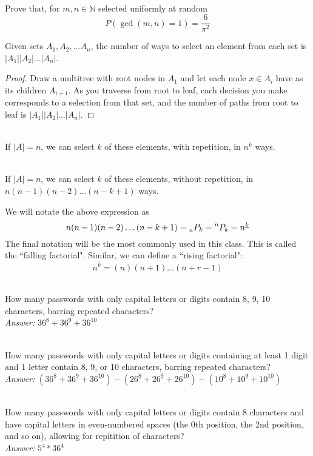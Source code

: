 \documentclass[11pt,twosided]{article}
\begin{document}
\begin{problem} \\
Prove that, for $m,n\in\mathbb{N}$ selected uniformly at random $$P(\gcd(m,n)=1) = \frac{6}{\pi^2}$$
\end{problem}
\begin{theorem}
Given sets $A_1, A_2, \dots A_n$, the number of ways to select an element from each set is $|A_1||A_2|\dots|A_n|$. 
\end{theorem}
\begin{proof}
Draw a multitree  with root nodes in $A_1$ and let each node $x\in A_i$ have as its children $A_{i+1}$. As you traverse from root to leaf, each decision you make corresponds to a selection from that set, and the number of paths from root to leaf is $|A_1||A_2|\dots|A_n|$.
\end{proof}
\begin{corollary}\\
If $|A| = n$, we can select $k$ of these elements, with repetition, in $n^k$ ways.
\end{corollary}
\begin{corollary}\\
If $|A| = n$, we can select $k$ of these elements, without repetition, in $n(n-1)(n-2)\dots (n-k+1)$ ways.
\end{corollary}
We will notate the above expression as 
$$n(n-1)(n-2)\dots(n-k+1) =\prescript{}{n}{P_k} = \prescript{n}{}{P_k}=n^{\underline{k}}$$
The final notation will be the most commonly used in this class. This is called the ``falling factorial". Similar, we can define a ``rising factorial":
$$n^{\overline{k}}=(n)(n+1)\dots(n+r-1)$$

\begin{problem}[Problem 1]\\
How many passwords with only capital letters or digits contain 8, 9, 10 characters, barring repeated characters?
\\ \emph{Answer:} $36^{\underline{8}}+36^{\underline{9}}+36^{\underline{10}}$
\end{problem}
\begin{problem}[Problem 2]\\
How many passwords with only capital letters or digits containing at least 1 digit and 1 letter contain 8, 9, or 10 characters, barring repeated characters?
\\ \emph{Answer:} $(36^{\underline{8}}+36^{\underline{9}}+36^{\underline{10}}) - (26^{\underline{8}}+26^{\underline{9}}+26^{\underline{10}}) - (10^{\underline{8}}+10^{\underline{9}}+10^{\underline{10}})$
\end{problem}
\begin{problem}[Problem 3]\\
How many passwords with only capital letters or digits contain 8 characters and have capital letters in even-numbered spaces (the 0th position, the 2nd position, and so on), allowing for repitition of characters? \\
\emph{Answer:} $5^4 * 36^4$
\end{problem}
\end{document}
